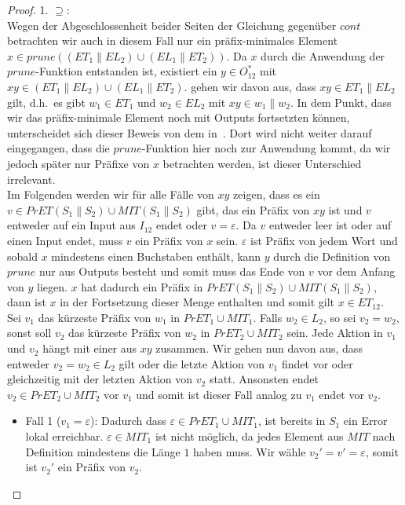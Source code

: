 \begin{proof}
  1. \glqq $\supseteq$\grqq :\\
  Wegen der Abgeschlossenheit beider Seiten der Gleichung gegenüber $cont$
  betrachten wir auch in diesem Fall nur ein präfix-minimales Element $x\in
  prune((ET_1\|EL_2)\cup (EL_1\|ET_2))$. Da $x$ durch die Anwendung der
  $prune$-Funktion entstanden ist, existiert ein $y\in O_{12}^*$ mit
  $xy\in(ET_1\|EL_2)\cup (EL_1\|ET_2)$. \OBdA{} gehen wir davon aus, dass
  $xy\in ET_1\|EL_2$ gilt, d.h.\ es gibt $w_1\in ET_1$ und $w_2\in EL_2$ mit
  $xy\in w_1\|w_2$. In dem Punkt, dass wir das präfix-minimale Element noch mit
  Outputs fortsetzten können, unterscheidet sich dieser Beweis von dem
  in~\cite{Schlosser2012BA}. Dort wird nicht weiter darauf eingegangen, dass
  die $prune$-Funktion hier noch zur Anwendung kommt, da wir jedoch später nur
  Präfixe von $x$ betrachten werden, ist dieser Unterschied irrelevant.\\
  Im Folgenden werden wir für alle Fälle von $xy$ zeigen, dass es ein $v\in
  PrET(S_1\|S_2)\cup MIT(S_1\|S_2)$ gibt, das ein Präfix von $xy$ ist und $v$
  entweder auf ein Input aus $I_{12}$ endet oder $v = \varepsilon$. Da $v$
  entweder leer ist oder auf einen Input endet, muss $v$ ein Präfix von $x$
  sein. $\varepsilon$ ist Präfix von jedem Wort und sobald $x$ mindestens einen
  Buchstaben enthält, kann $y$ durch die Definition von $prune$ nur aus Outputs
  besteht und somit muss das Ende von $v$ vor dem Anfang von $y$ liegen. $x$
  hat dadurch ein Präfix in $PrET(S_1\|S_2)\cup MIT(S_1\|S_2)$, dann ist $x$ in
  der Fortsetzung dieser Menge enthalten und somit gilt $x\in ET_{12}$.\\
  Sei $v_1$ das kürzeste Präfix von $w_1$ in $PrET_1\cup MIT_1$. Falls
  $w_2\in L_2$, so sei $v_2=w_2$, sonst soll $v_2$ das kürzeste Präfix von
  $w_2$ in $PrET_2\cup MIT_2$ sein. Jede Aktion in $v_1$ und $v_2$ hängt mit
  einer aus $xy$ zusammen. Wir gehen nun davon aus, dass entweder
  $v_2=w_2\in L_2$ gilt oder die letzte Aktion von $v_1$ findet vor oder
  gleichzeitig mit der letzten Aktion von $v_2$ statt. Ansonsten endet
  $v_2\in PrET_2\cup MIT_2$ vor $v_1$ und somit ist dieser Fall analog zu $v_1$
  endet vor $v_2$.
  \begin{itemize}
    \item Fall 1 ($v_1=\varepsilon$): Dadurch dass $\varepsilon\in PrET_1\cup
      MIT_1$, ist bereits in $S_1$ ein Error lokal erreichbar. $\varepsilon\in
      MIT_1$ ist nicht möglich, da jedes Element aus $MIT$ nach Definition
      mindestens die Länge $1$ haben muss. Wir wähle
      $v_2'=v'=\varepsilon$, somit ist $v_2'$ ein Präfix von $v_2$.

\end{itemize}
\end{proof}

